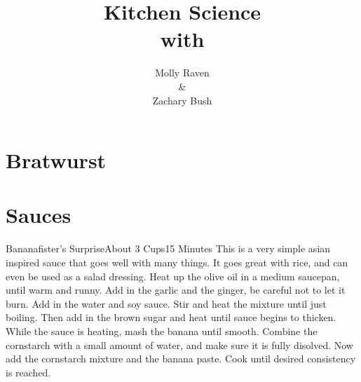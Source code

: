 \documentclass[a4paper]{book}
\title{Kitchen Science\\with}
\author{Molly Raven\\\&\\Zachary Bush}
\begin{document}
\maketitle
\tableofcontents
\chapter{Bratwurst}

\chapter{Sauces}
\begin{recipe}{Bananafister's Surprise}{About 3 Cups}{15 Minutes}
\freeform This is a very simple asian inspired sauce that goes well with many 
things. It goes great with rice, and can even be used as a salad dressing. 
Heat up the olive oil in a medium saucepan, until warm and runny. Add in the
garlic and the ginger, be careful not to let it burn.
Add in the water and soy sauce. Stir and heat the mixture until just boiling.
Then add in the brown sugar and heat until sauce begins to thicken. 
While the sauce is heating, mash the banana until smooth. Combine the cornstarch
with a small amount of water, and make sure it is fully disolved. Now add the
cornstarch mixture and the banana paste. Cook until desired consistency is
reached.
\end{recipe}
\end{document}
